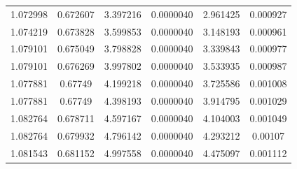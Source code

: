 \documentclass[11pt,dvipdfmx]{jarticle}
\begin{document}
\begin{table}[H]
\begin{tabular}{cccccc}
			1.072998 & 0.672607 & 3.397216 & 0.0000040 & 2.961425 & 0.000927 \\
			1.074219 & 0.673828 & 3.599853 & 0.0000040 & 3.148193 & 0.000961 \\
			1.079101 & 0.675049 & 3.798828 & 0.0000040 & 3.339843 & 0.000977 \\
			1.079101 & 0.676269 & 3.997802 & 0.0000040 & 3.533935 & 0.000987 \\
			1.077881 & 0.67749 & 4.199218 & 0.0000040 & 3.725586 & 0.001008 \\
			1.077881 & 0.67749 & 4.398193 & 0.0000040 & 3.914795 & 0.001029 \\
			1.082764 & 0.678711 & 4.597167 & 0.0000040 & 4.104003 & 0.001049 \\
			1.082764 & 0.679932 & 4.796142 & 0.0000040 & 4.293212 & 0.00107 \\
			1.081543 & 0.681152 & 4.997558 & 0.0000040 & 4.475097 & 0.001112 \\
			\hline
			\end{tabular}
			\label{tab:出力特性測定結果4}
		\end{table}
\end{document}
